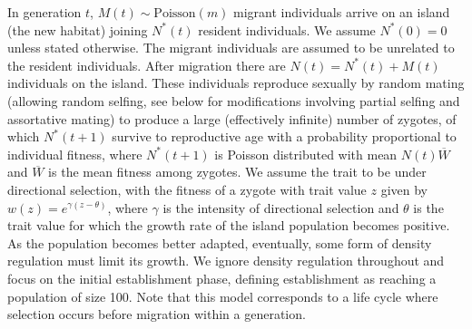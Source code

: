 \documentclass[12pt,a4paper]{article}
\begin{document}
    In generation $t$, $M(t) \sim \mathrm{Poisson}(m)$ migrant individuals
    arrive on an island (the new habitat) joining $N^\ast(t)$ resident
    individuals.
    We assume $N^\ast(0)=0$ unless stated otherwise. 
    The migrant individuals are assumed to be unrelated to the resident
    individuals.
    After migration there are $N(t) = N^\ast(t) + M(t)$ individuals on the
    island.
    These individuals reproduce sexually by random mating (allowing random
    selfing, see below for modifications involving partial selfing and
    assortative mating) to produce a large (effectively infinite) number of
    zygotes, of which $N^\ast(t+1)$ survive to reproductive age with a
    probability proportional to individual fitness, where $N^\ast(t+1)$ is
    Poisson distributed with mean $N(t)\overline{W}$ and $\overline{W}$ is the
    mean fitness among zygotes.
    We assume the trait to be under directional selection, with the fitness of a
    zygote with trait value $z$ given by $w(z) = e^{\gamma(z - \theta)}$, where
    $\gamma$ is the intensity of directional selection and $\theta$ is the
    trait value for which the growth rate of the island population becomes
    positive.
    As the population becomes better adapted, eventually, some form of density
    regulation must limit its growth.
    We ignore density regulation throughout and focus on the initial establishment
    phase, defining establishment as reaching a population of size 100.
    Note that this model corresponds to a life cycle where selection occurs
    before migration within a generation.
\end{document}
